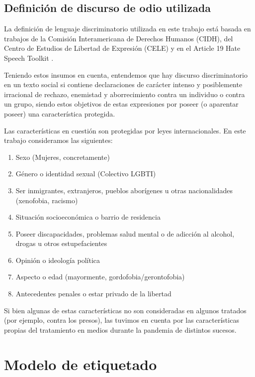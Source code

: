 \subsection{Definición de discurso de odio utilizada}

La definición de lenguaje discriminatorio utilizada en este trabajo está basada en trabajos de la Comisión Interamericana de Derechos Humanos (CIDH)\cite{CIDH2015}, del Centro de Estudios de Libertad de Expresión (CELE) \cite{cele2019} y en el Article 19 Hate Speech Toolkit \cite{article192015}.

Teniendo estos insumos en cuenta, entendemos que hay discurso discriminatorio en un texto social si contiene declaraciones de carácter intenso y posiblemente irracional de rechazo, enemistad y aborrecimiento contra un individuo o contra un grupo, siendo estos objetivos de estas expresiones por poseer (o aparentar poseer) una característica protegida.

Las características en cuestión son protegidas por leyes internacionales. En este trabajo consideramos las siguientes:

\begin{enumerate}
\item Sexo (Mujeres, concretamente)
\item Género o identidad sexual (Colectivo LGBTI)
\item Ser inmigrantes, extranjeros, pueblos aborígenes u otras nacionalidades (xenofobia, racismo)
\item Situación socioeconómica o barrio de residencia
\item Poseer discapacidades, problemas salud mental o de adicción al alcohol, drogas u otros estupefacientes
\item Opinión o ideología política
\item Aspecto o edad (mayormente, gordofobia/gerontofobia)
\item Antecedentes penales o estar privado de la libertad
\end{enumerate}

Si bien algunas de estas características no son consideradas en algunos tratados (por ejemplo, contra los presos), las tuvimos en cuenta por las características propias del tratamiento en medios durante la pandemia de distintos sucesos.


\section{Modelo de etiquetado}



